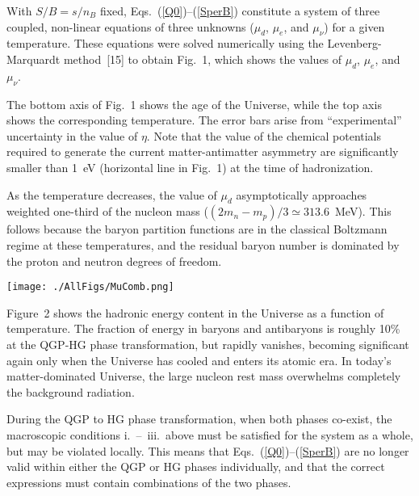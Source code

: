 \begin{mdframed}[linecolor=gray,roundcorner=12pt,backgroundcolor=Dandelion!15,linewidth=1pt,leftmargin=0cm,rightmargin=0cm,topline=true,bottomline=true,skipabove=12pt]
With $S/B = s/n_B$ fixed, Eqs.~(\ref{Q0})--(\ref{SperB}) constitute a system of three coupled, non-linear equations of three unknowns ($\mu_d$, $\mu_e$, and $\mu_\nu$) for a given temperature. These equations were solved numerically using the Levenberg-Marquardt method~[15] to obtain Fig.~1, which shows the values of $\mu_d$, $\mu_e$, and $\mu_\nu$.

The bottom axis of Fig.~1 shows the age of the Universe, while the top axis shows the corresponding temperature. The error bars arise from ``experimental'' uncertainty in the value of $\eta$. Note that the value of the chemical potentials required to generate the current matter-antimatter asymmetry are significantly smaller than 1~eV (horizontal line in Fig.~1) at the time of hadronization.

As the temperature decreases, the value of $\mu_d$ asymptotically approaches weighted one-third of the nucleon mass ($(2m_n-m_p)/3\simeq 313.6$~MeV). This follows because the baryon partition functions are in the classical Boltzmann regime at these temperatures, and the residual baryon number is dominated by the proton and neutron degrees of freedom.

\centerline{\texttt{[image: ./AllFigs/MuComb.png]}}


Figure~2 shows the hadronic energy content in the Universe as a function of temperature. The fraction of energy in baryons and antibaryons is roughly 10\% at the QGP-HG phase transformation, but rapidly vanishes, becoming significant again only when the Universe has cooled and enters its atomic era. In today's matter-dominated Universe, the large nucleon rest mass overwhelms completely the background radiation.


During the QGP to HG phase transformation, when both phases co-exist, the macroscopic conditions i.~--~iii.~above must be satisfied for the system as a whole, but may be violated locally. This means that Eqs.~(\ref{Q0})--(\ref{SperB}) are no longer valid within either the QGP or HG phases individually, and that the correct expressions must contain combinations of the two phases.


\end{mdframed}
